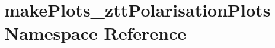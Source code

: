 \hypertarget{namespacemakePlots__zttPolarisationPlots}{
\section{makePlots\_\-zttPolarisationPlots Namespace Reference}
\label{namespacemakePlots__zttPolarisationPlots}
}
